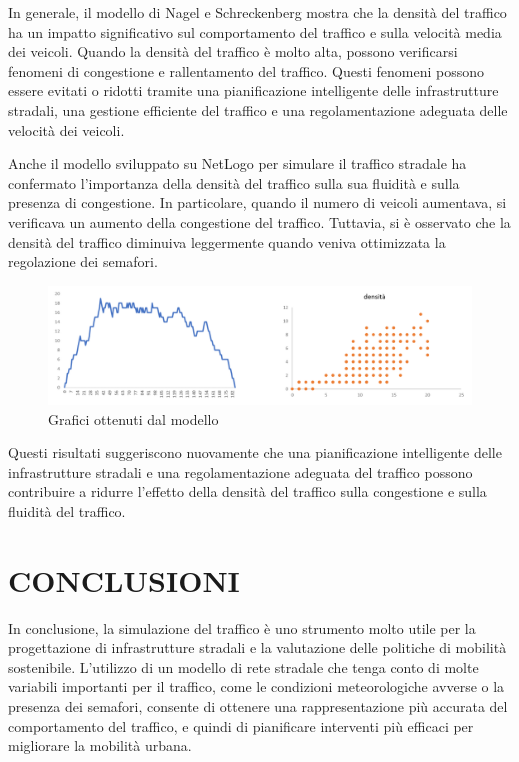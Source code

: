 \documentclass[11pt]{article}
\begin{document}
In generale, il modello di Nagel e Schreckenberg mostra che la densità del traffico ha un impatto significativo sul comportamento del traffico e sulla velocità media dei veicoli. Quando la densità del traffico è molto alta, possono verificarsi fenomeni di congestione e rallentamento del traffico. Questi fenomeni possono essere evitati o ridotti tramite una pianificazione intelligente delle infrastrutture stradali, una gestione efficiente del traffico e una regolamentazione adeguata delle velocità dei veicoli.

Anche il modello sviluppato su NetLogo per simulare il traffico stradale ha confermato l'importanza della densità del traffico sulla sua fluidità e sulla presenza di congestione. In particolare, quando il numero di veicoli aumentava, si verificava un aumento della congestione del traffico. Tuttavia, si è osservato che la densità del traffico diminuiva leggermente quando veniva ottimizzata la regolazione dei semafori.

\begin{figure}
    \centering
    \includegraphics[width=1\textwidth]{fig2.png}
    \caption{Grafici ottenuti dal modello} 
\end{figure}

Questi risultati suggeriscono nuovamente che una pianificazione intelligente delle infrastrutture stradali e una regolamentazione adeguata del traffico possono contribuire a ridurre l'effetto della densità del traffico sulla congestione e sulla fluidità del traffico.

\section{CONCLUSIONI}
In conclusione, la simulazione del traffico è uno strumento molto utile per la progettazione di infrastrutture stradali e la valutazione delle politiche di mobilità sostenibile. L'utilizzo di un modello di rete stradale che tenga conto di molte variabili importanti per il traffico, come le condizioni meteorologiche avverse o la presenza dei semafori, consente di ottenere una rappresentazione più accurata del comportamento del traffico, e quindi di pianificare interventi più efficaci per migliorare la mobilità urbana.
\end{document}
